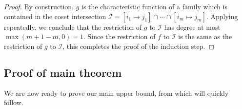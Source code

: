 \documentclass[10pt,a4paper]{amsart}
\theoremstyle{definition}
\providecommand{\coset}[2]{[#1 \mapsto #2]}
\begin{document}
\begin{proof}
By construction, $g$ is the characteristic function of a family which is contained in the coset intersection $\mathcal{I} = \coset{i_1}{j_1} \cap \cdots \cap \coset{i_m}{j_m}$. Applying  repeatedly, we conclude that the restriction of $g$ to $\mathcal{I}$ has degree at most $\max(m+1-m,0) = 1$. Since the restriction of $f$ to $\mathcal{I}$ is the same as the restriction of $g$ to $\mathcal{I}$, this completes the proof of the induction step.
\end{proof}

\subsection{Proof of main theorem} \label{sec:proof-sym}

We are now ready to prove our main upper bound, from which  will quickly follow.
\end{document}
